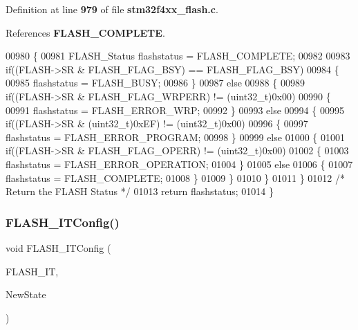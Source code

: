 Definition at line \textbf{ 979} of file \textbf{ stm32f4xx\+\_\+flash.\+c}.



References \textbf{ F\+L\+A\+S\+H\+\_\+\+C\+O\+M\+P\+L\+E\+TE}.


\begin{DoxyCode}
00980 \{
00981   FLASH_Status flashstatus = FLASH_COMPLETE;
00982   
00983   \textcolor{keywordflow}{if}((FLASH->SR & FLASH_FLAG_BSY) == FLASH_FLAG_BSY) 
00984   \{
00985     flashstatus = FLASH_BUSY;
00986   \}
00987   \textcolor{keywordflow}{else} 
00988   \{  
00989     \textcolor{keywordflow}{if}((FLASH->SR & FLASH_FLAG_WRPERR) != (uint32\_t)0x00)
00990     \{ 
00991       flashstatus = FLASH_ERROR_WRP;
00992     \}
00993     \textcolor{keywordflow}{else} 
00994     \{
00995       \textcolor{keywordflow}{if}((FLASH->SR & (uint32\_t)0xEF) != (uint32\_t)0x00)
00996       \{
00997         flashstatus = FLASH_ERROR_PROGRAM; 
00998       \}
00999       \textcolor{keywordflow}{else}
01000       \{
01001         \textcolor{keywordflow}{if}((FLASH->SR & FLASH_FLAG_OPERR) != (uint32\_t)0x00)
01002         \{
01003           flashstatus = FLASH_ERROR_OPERATION;
01004         \}
01005         \textcolor{keywordflow}{else}
01006         \{
01007           flashstatus = FLASH_COMPLETE;
01008         \}
01009       \}
01010     \}
01011   \}
01012   \textcolor{comment}{/* Return the FLASH Status */}
01013   \textcolor{keywordflow}{return} flashstatus;
01014 \}
\end{DoxyCode}
\mbox{\label{group__FLASH__Group4_ga94c1e51a9c3bf8d48eb6eb4a4d054861}} 
\subsubsection{F\+L\+A\+S\+H\+\_\+\+I\+T\+Config()}
{\footnotesize\ttfamily void F\+L\+A\+S\+H\+\_\+\+I\+T\+Config (\begin{DoxyParamCaption}\item[{uint32\+\_\+t}]{F\+L\+A\+S\+H\+\_\+\+IT,  }\item[{\textbf{ Functional\+State}}]{New\+State }\end{DoxyParamCaption})}




